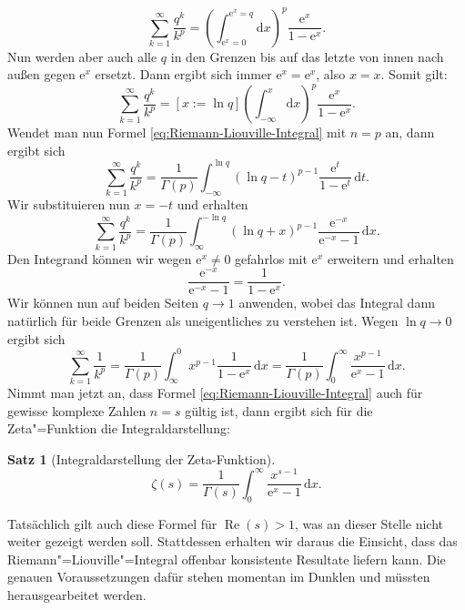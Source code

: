 \documentclass[a4paper,10pt,fleqn,twocolumn,twoside,dvipdfmx]{scrartcl}
\numberwithin{equation}{section}
\newcommand{\ee}{\mathrm e}
\DeclareMathOperator{\real}{Re}
\theoremstyle{rmbox}
\newtheorem{theorem}{Satz}
\begin{document}
\begin{equation}
\sum_{k=1}^\infty \frac{q^k}{k^p}
= \left(\int_{\ee^x=0}^{\ee^x=q} \mathrm dx\right)^p \frac{\ee^x}{1-\ee^x}.
\end{equation}
Nun werden aber auch alle $q$ in den Grenzen bis auf das letzte
von innen nach außen gegen $\ee^x$ ersetzt. Dann ergibt sich
immer $\ee^x=\ee^x$, also $x=x$. Somit gilt:%
\begin{equation}
\sum_{k=1}^\infty \frac{q^k}{k^p}
= [x:=\ln q]\left(\int_{-\infty}^{x} \mathrm dx\right)^p \frac{\ee^x}{1-\ee^x}.
\end{equation}
Wendet man nun Formel \eqref{eq:Riemann-Liouville-Integral}
mit $n=p$ an, dann ergibt sich%
\begin{equation}
\sum_{k=1}^\infty \frac{q^k}{k^p}
= \frac{1}{\Gamma(p)}\int_{-\infty}^{\ln q} (\ln q-t)^{p-1}\frac{\ee^t}{1-\ee^t}\,\mathrm dt.
\end{equation}
Wir substituieren nun $x=-t$ und erhalten
\begin{equation}
\sum_{k=1}^\infty \frac{q^k}{k^p}
= \frac{1}{\Gamma(p)}\int_{\infty}^{-\ln q} (\ln q+x)^{p-1}\frac{\ee^{-x}}{\ee^{-x}-1}\,\mathrm dx.
\end{equation}
Den Integrand können wir wegen $\ee^x\ne 0$ gefahrlos mit $\ee^x$
erweitern und erhalten%
\begin{equation}
\frac{\ee^{-x}}{\ee^{-x}-1} = \frac{1}{1-\ee^x}.
\end{equation}
Wir können nun auf beiden Seiten $q\to 1$ anwenden, wobei das Integral
dann natürlich für beide Grenzen als uneigentliches zu verstehen
ist. Wegen $\ln q\to 0$ ergibt sich%
\begin{equation}
\sum_{k=1}^\infty \frac{1}{k^p}
= \frac{1}{\Gamma(p)}\int_{\infty}^0 x^{p-1}\frac{1}{1-\ee^x}\,\mathrm dx
= \frac{1}{\Gamma(p)}\int_0^\infty \frac{x^{p-1}}{\ee^x-1}\,\mathrm dx.
\end{equation}
Nimmt man jetzt an, dass Formel \eqref{eq:Riemann-Liouville-Integral}
auch für gewisse komplexe Zahlen $n=s$ gültig ist, dann ergibt sich
für die Zeta"=Funktion die Integraldarstellung:%
\begin{theorem}[Integraldarstellung der Zeta-Funktion]
\begin{equation}
\zeta(s) = \frac{1}{\Gamma(s)}\int_0^\infty \frac{x^{s-1}}{\ee^x-1}\,\mathrm dx.
\end{equation}
\end{theorem}
Tatsächlich gilt auch diese Formel für $\real(s)>1$, was an dieser
Stelle nicht weiter gezeigt werden soll. Stattdessen erhalten wir
daraus die Einsicht, dass das Riemann"=Liouville"=Integral offenbar
konsistente Resultate liefern kann. Die genauen Voraussetzungen dafür
stehen momentan im Dunklen und müssten herausgearbeitet werden.
\end{document}
